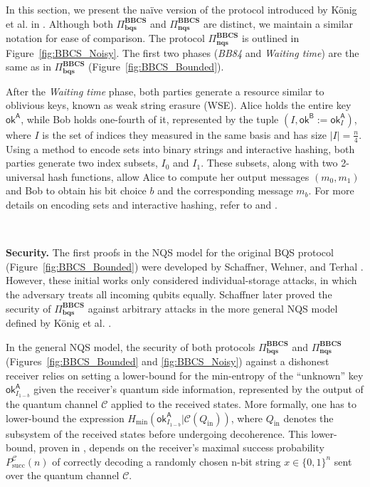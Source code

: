 In this section, we present the na\"ive version of the protocol introduced by K\"onig et al. in \cite{KWW12}. Although both $\Pi^{\textbf{BBCS}}_{\textbf{bqs}}$ and $\Pi^{\textbf{BBCS}}_{\textbf{nqs}}$ are distinct, we maintain a similar notation for ease of comparison. The protocol $\Pi^{\textbf{BBCS}}_{\textbf{nqs}}$ is outlined in Figure~\ref{fig:BBCS_Noisy}. The first two phases (\textit{BB84} and \textit{Waiting time}) are the same as in $\Pi^{\textbf{BBCS}}_{\textbf{bqs}}$ (Figure~\ref{fig:BBCS_Bounded}).

After the \textit{Waiting time} phase, both parties generate a resource similar to oblivious keys, known as weak string erasure (WSE). Alice holds the entire key $\mathsf{ok}^{\mathsf{A}}$, while Bob holds one-fourth of it, represented by the tuple $(I, \mathsf{ok}^{\mathsf{B}} := \mathsf{ok}^{\mathsf{A}}_I)$, where $I$ is the set of indices they measured in the same basis and has size $|I| = \frac{n}{4}$. Using a method to encode sets into binary strings and interactive hashing, both parties generate two index subsets, $I_0$ and $I_1$. These subsets, along with two 2-universal hash functions, allow Alice to compute her output messages $(m_0, m_1)$ and Bob to obtain his bit choice $b$ and the corresponding message $m_b$. For more details on encoding sets and interactive hashing, refer to \cite{DHRS04} and \cite{S07}.


\

\noindent\textbf{Security.}  The first proofs in the NQS model for the original BQS protocol (Figure~\ref{fig:BBCS_Bounded}) were developed by Schaffner, Wehner, and Terhal \cite{WST08, STW09}. However, these initial works only considered individual-storage attacks, in which the adversary treats all incoming qubits equally. Schaffner later proved \cite{S10} the security of $\Pi^{\textbf{BBCS}}_{\textbf{bqs}}$ against arbitrary attacks in the more general NQS model defined by K\"onig et al. \cite{KWW12}.

In the general NQS model, the security of both protocols $\Pi^{\textbf{BBCS}}_{\textbf{bqs}}$ and $\Pi^{\textbf{BBCS}}_{\textbf{nqs}}$ (Figures~\ref{fig:BBCS_Bounded} and \ref{fig:BBCS_Noisy}) against a dishonest receiver relies on setting a lower-bound for the min-entropy of the ``unknown'' key $\mathsf{ok}^{\mathsf{A}}_{I_{1-b}}$ given the receiver's quantum side information, represented by the output of the quantum channel $\mathcal{C}$ applied to the received states. More formally, one has to lower-bound the expression $H_{\text{min}}\left(\mathsf{ok}^{\mathsf{A}}_{I_{1-b}} | \mathcal{C}\left(Q_{\text{in}}\right)\right)$, where $Q_{\text{in}}$ denotes the subsystem of the received states before undergoing decoherence. This lower-bound, proven in \cite{KWW12}, depends on the receiver's maximal success probability $P^{\mathcal{C}}_{\text{succ}}(n)$ of correctly decoding a randomly chosen n-bit string $x \in \{0,1\}^n$ sent over the quantum channel $\mathcal{C}$.  %

